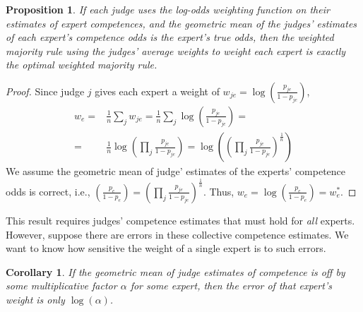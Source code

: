 \documentclass[letterpaper]{article} %
\newtheorem{proposition}{Proposition}
\newtheorem{corollary}{Corollary}
\newcommand{\judge}{\ensuremath{j} }
\newcommand{\experts}{\ensuremath{E} }
\newcommand{\expert}{\ensuremath{e} }
\begin{document}
\begin{proposition}\label{theorem:optimal}
If each judge uses the log-odds weighting function on their estimates of expert competences, and the geometric mean of the judges' estimates of each expert's competence odds is the expert's true odds, then the weighted majority rule using the judges' average weights to weight each expert is exactly the optimal weighted majority rule.
\end{proposition}

\begin{proof}
Since judge $\judge$ gives each expert a weight of $w_{\judge\expert} = \log ( \frac{p_{\judge\expert}}{1-p_{\judge\expert}} )$,
\scriptsize
\begin{align*}
 w_\expert = &\frac{1}{n} \sum\limits_\judge w_{\judge\expert} = \frac{1}{n} \sum\limits_\judge \log ( \frac{p_{\judge\expert}}{1-p_{\judge\expert}} )=\\
 = &\frac{1}{n} \log ( \prod_\judge \frac{p_{\judge\expert}}{1-p_{\judge\expert}} )= \log ( ( \prod_\judge \frac{p_{\judge\expert}}{1-p_{\judge\expert}} )^\frac{1}{n} ) 
\end{align*}
\normalsize
We assume the geometric mean of judge' estimates of the experts' competence odds is correct, i.e., $( \frac{p_\expert}{1-p_\expert}) = (\prod\limits_\judge \frac{p_{\judge\expert}}{1-p_{\judge\expert}} )^\frac{1}{n}$. Thus, $w_\expert = \log( \frac{p_\expert}{1-p_\expert}) = w^*_\expert$.
\end{proof}



This result requires judges' competence estimates that must hold for \emph{all} experts. However, suppose there are errors in these collective competence estimates. We want to know how sensitive the weight of a single expert is to such errors. 

\begin{corollary}\label{corollary:optimal}
If the geometric mean of judge estimates of competence is off by some multiplicative factor $\alpha$ for some expert, then the error of that expert's weight is only $\log(\alpha)$.
\end{corollary}
\end{document}
